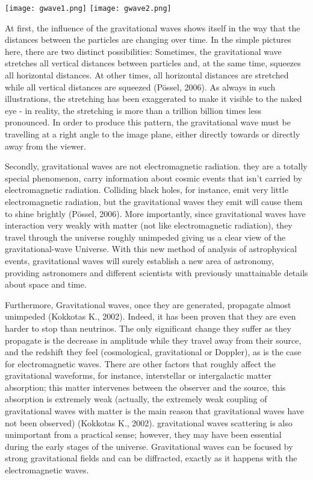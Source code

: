 \documentclass[11]{article}
\begin{document}
\begin{center}
\texttt{[image: gwave1.png]}
\texttt{[image: gwave2.png]}
\end{center}
At first, the influence of the gravitational waves shows itself in the way that the distances between the particles are changing over time. In the simple pictures here, there are two distinct possibilities: Sometimes, the gravitational wave stretches all vertical distances between particles and, at the same time, squeezes all horizontal distances. At other times, all horizontal distances are stretched while all vertical distances are squeezed (Pössel, 2006). As always in such illustrations, the stretching has been exaggerated to make it visible to the naked eye - in reality, the stretching is more than a trillion billion times less pronounced. In order to produce this pattern, the gravitational wave must be travelling at a right angle to the image plane, either directly towards or directly away from the viewer.

\vspace{5mm}
Secondly, gravitational waves are not electromagnetic radiation. they are a totally special phenomenon, carry information about cosmic events that isn't carried by electromagnetic radiation. Colliding black holes, for instance, emit very little electromagnetic radiation, but the gravitational waves they emit will cause them to shine brightly (Pössel, 2006). More importantly, since gravitational waves have interaction very weakly with matter (not like electromagnetic radiation), they travel through the universe roughly unimpeded giving us a clear view of the gravitational-wave Universe. With this new method of analysis of astrophysical events, gravitational waves will surely establish a new area of astronomy, providing astronomers and different scientists with previously unattainable details about space and time.

\vspace{5mm}
Furthermore, Gravitational waves, once they are generated, propagate almost unimpeded (Kokkotas K., 2002). Indeed, it has been proven that they are even harder to stop than neutrinos. The only significant change they suffer as they propagate is the decrease in amplitude while they travel away from their source, and the redshift they feel (cosmological, gravitational or Doppler), as is the case for electromagnetic waves. There are other factors that roughly affect the gravitational waveforms, for instance, interstellar or intergalactic matter absorption; this matter intervenes between the observer and the source, this absorption is extremely weak  (actually, the extremely weak coupling of gravitational waves with matter is the main reason that gravitational waves have not been observed) (Kokkotas K., 2002). gravitational waves scattering is also unimportant from a practical sense; however, they may have been essential during the early stages of the universe. Gravitational waves can be focused by strong gravitational fields and can be diffracted, exactly as it happens with the electromagnetic waves.
\end{document}
